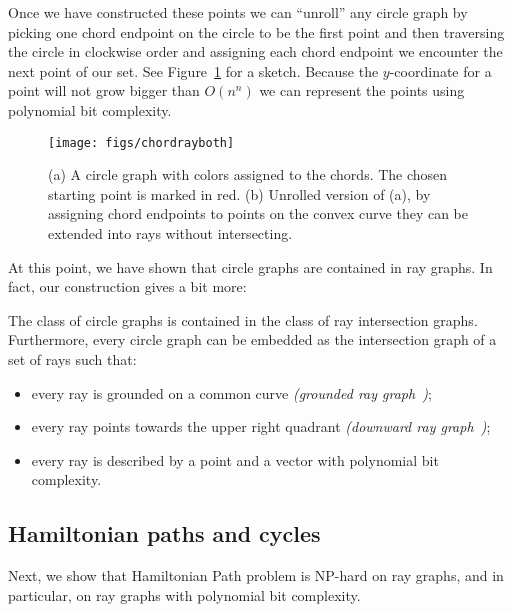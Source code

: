 \documentclass[]{llncs}
\begin{document}
%
Once we have constructed these points we can ``unroll'' any circle graph by picking one chord endpoint on the circle to be the first point and then traversing the circle in clockwise order and assigning each chord endpoint we encounter the next point of our set. See Figure~\ref{fig:chordraysketch} for a sketch. Because the $y$-coordinate for a point will not grow bigger than $O(n^n)$ we can represent the points using polynomial bit complexity.
%
\begin{figure}[t]
\centering
\texttt{[image: figs/chordrayboth]}
\caption{(a) A circle graph with colors assigned to the chords. The chosen starting point is marked in red. (b) Unrolled version of (a), by assigning chord endpoints to points on the convex curve they can be extended into rays without intersecting.}
\label{fig:chordraysketch}
\end{figure}
%
  At this point, we have shown that circle graphs are contained in ray graphs. In fact, our construction gives a bit more:

\begin {theorem} \label {thm:circleray}
  The class of circle graphs is contained in the class of ray intersection graphs.
  Furthermore, every circle graph can be embedded as the intersection graph of a set of rays such that:
  \begin {itemize}
  \item every ray is grounded on a common curve {\em(grounded ray graph~\cite {JGAA-470})};
  \item every ray points towards the upper right quadrant {\em(downward ray graph~\cite {JGAA-470})};
  \item every ray is described by a point and a vector with polynomial bit complexity.
  \end {itemize}
\end {theorem}
%

\subsection {Hamiltonian paths and cycles}

Next, we show that Hamiltonian Path problem is NP-hard on ray graphs, and in particular, on ray graphs with polynomial bit complexity.
 
\end{document}

